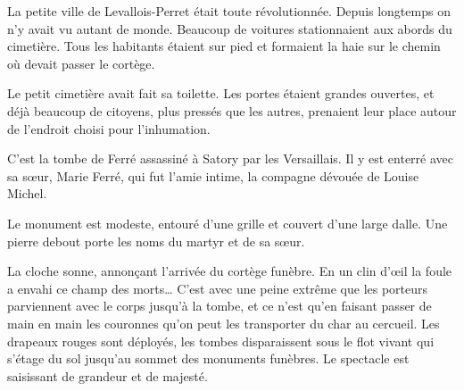 \documentclass[french,twoside]{book} %
\def\mednobreak{\ifdim\lastskip<\medskipamount
  \removelastskip\nopagebreak\medskip\fi}
\newcommand{\labelblock}[1]{\medbreak{\noindent\color{rubric}\bfseries #1}\par\mednobreak}
\newenvironment{quoteblock}%
  {\begin{quoting}}
  {\end{quoting}}
\newenvironment{quotebar}{%
    \def\FrameCommand{{\color{rubric!10!}\vrule width 0.5em} \hspace{0.9em}}%
    \def\OuterFrameSep{\itemsep} %
    \MakeFramed {\advance\hsize-\width \FrameRestore}
  }%
  {%
    \endMakeFramed
  }
\renewenvironment{quoteblock}%
  {%
    \savenotes
    \setstretch{0.9}
    \normalfont
    \begin{quotebar}
  }
  {%
    \end{quotebar}
    \spewnotes
  }
\begin{document}
\begin{quoteblock}
\labelblock{AU CIMETIÈRE}

 \noindent La petite ville de Levallois-Perret était toute révolutionnée. Depuis longtemps on n’y avait vu autant de monde. Beaucoup de voitures stationnaient aux abords du cimetière. Tous les habitants étaient sur pied et formaient la haie sur le chemin où devait passer le cortège.\par
 Le petit cimetière avait fait sa toilette. Les portes étaient grandes ouvertes, et déjà beaucoup de citoyens, plus pressés que les autres, prenaient leur place autour de l’endroit choisi pour l’inhumation.\par
 C’est la tombe de Ferré assassiné à Satory par les Versaillais. Il y est enterré avec sa sœur, Marie Ferré, qui fut l’amie intime, la compagne dévouée de Louise Michel.\par
 Le monument est modeste, entouré d’une grille et couvert d’une large dalle. Une pierre debout porte les noms du martyr et de sa sœur.\par
 La cloche sonne, annonçant l’arrivée du cortège funèbre. En un clin d’œil la foule a envahi ce champ des morts… C’est avec une peine extrême que les porteurs parviennent avec le corps jusqu’à la tombe, et ce n’est qu’en faisant passer de main en main les couronnes qu’on peut les transporter du char au cercueil. Les drapeaux rouges sont déployés, les tombes disparaissent sous le flot vivant qui s’étage du sol jusqu’au  sommet des monuments funèbres. Le spectacle est saisissant de grandeur et de majesté.\par
 
\labelblock{LES DISCOURS}


\end{quoteblock}
\end{document}
